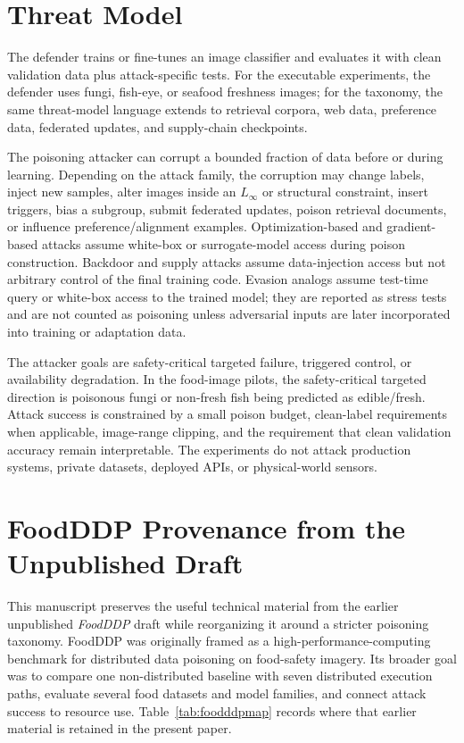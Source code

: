 ﻿\documentclass[6p,10pt,times]{ieeeaccess}
\begin{document}
\section{Threat Model}

The defender trains or fine-tunes an image classifier and evaluates it with clean validation data plus attack-specific tests. For the executable experiments, the defender uses fungi, fish-eye, or seafood freshness images; for the taxonomy, the same threat-model language extends to retrieval corpora, web data, preference data, federated updates, and supply-chain checkpoints.

The poisoning attacker can corrupt a bounded fraction of data before or during learning. Depending on the attack family, the corruption may change labels, inject new samples, alter images inside an \(L_\infty\) or structural constraint, insert triggers, bias a subgroup, submit federated updates, poison retrieval documents, or influence preference/alignment examples. Optimization-based and gradient-based attacks assume white-box or surrogate-model access during poison construction. Backdoor and supply attacks assume data-injection access but not arbitrary control of the final training code. Evasion analogs assume test-time query or white-box access to the trained model; they are reported as stress tests and are not counted as poisoning unless adversarial inputs are later incorporated into training or adaptation data.

The attacker goals are safety-critical targeted failure, triggered control, or availability degradation. In the food-image pilots, the safety-critical targeted direction is poisonous fungi or non-fresh fish being predicted as edible/fresh. Attack success is constrained by a small poison budget, clean-label requirements when applicable, image-range clipping, and the requirement that clean validation accuracy remain interpretable. The experiments do not attack production systems, private datasets, deployed APIs, or physical-world sensors.

\section{FoodDDP Provenance from the Unpublished Draft}

This manuscript preserves the useful technical material from the earlier unpublished \emph{FoodDDP} draft while reorganizing it around a stricter poisoning taxonomy. FoodDDP was originally framed as a high-performance-computing benchmark for distributed data poisoning on food-safety imagery. Its broader goal was to compare one non-distributed baseline with seven distributed execution paths, evaluate several food datasets and model families, and connect attack success to resource use. Table~\ref{tab:foodddpmap} records where that earlier material is retained in the present paper.
\end{document}
